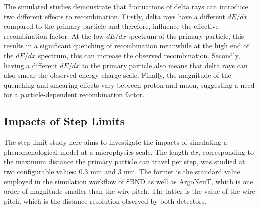 The simulated studies demonstrate that fluctuations of delta rays can introduce two different effects to recombination.
Firstly, delta rays have a different $dE/dx$ compared to the primary particle and therefore, influence the effective recombination factor.
At the low $dE/dx$ spectrum of the primary particle, this results in a significant quenching of recombination meanwhile at the high end of the $dE/dx$ spectrum, this can increase the observed recombination.
Secondly, having a different $dE/dx$ to the primary particle also means that delta rays can also smear the observed energy-charge scale.
Finally, the magnitude of the quenching and smearing effects vary between proton and muon, suggesting a need for a particle-dependent recombination factor.   

\subsection{Impacts of Step Limits}
\label{sec:impactStepLimit}

The step limit study here aims to investigate the impacts of simulating a phenomenological model at a microphysics scale.
The length $dx$, corresponding to the maximum distance the primary particle can travel per step, was studied at two configurable values: 0.3 mm and 3 mm.     
The former is the standard value employed in the simulation workflow of SBND as well as ArgoNeuT, which is one order of magnitude smaller than the wire pitch. 
The latter is the value of the wire pitch, which is the distance resolution observed by both detectors.

